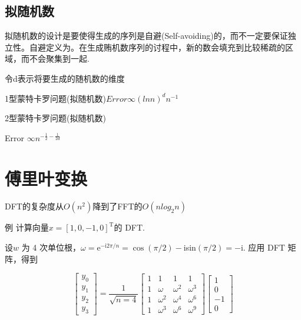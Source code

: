 \documentclass[UTF8,5pt,a4paper]{ctexart} %
\begin{document}
\begin{multicols}{4}
\subsection{拟随机数}
拟随机数的设计是要使得生成的序列是自避(Self-avoiding)的，而不一定要保证独立性。自避定义为。在生成贿机数序列的讨程中，新的数会填充到比较稀疏的区域，而不会聚集到一起.

令d表示将要生成的随机数的维度

1型蒙特卡罗问题(拟随机数)$Error\infty(lnn)^dn^{-1}$

2型蒙特卡罗问题(拟随机数)

Error $\infty n^{- \frac 12- \frac 1{2d}}$
\section{傅里叶变换}
DFT的复杂度从$O(n^2)$降到了FFT的$O(nlog_2n)$

例  计算向量$x=[1,0,-1,0]^{\mathrm{T}}$的 DFT.

设$w$ 为 4 次单位根，$\omega = \mathrm{e} ^{- \mathrm{i} 2\pi / n}= \cos ( \pi / 2) -$isin$( \pi / 2) = -$i.  应用 DFT 矩阵，得到


$$\begin{bmatrix}y_0\\y_1\\y_2\\y_3\end{bmatrix}=\dfrac{1}{\sqrt{n=4}}\begin{bmatrix}1&1&1&1\\1&\omega&\omega^2&\omega^3\\1&\omega^2&\omega^4&\omega^6\\1&\omega^3&\omega^6&\omega^9\end{bmatrix}\begin{bmatrix}1\\0\\-1\\0\end{bmatrix}$$
\end{multicols}
\end{document}
